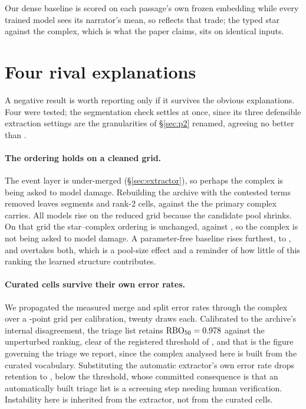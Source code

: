 \documentclass[conference]{IEEEtran}
\begin{document}
Our dense baseline is scored on each passage's own frozen embedding while every trained model
sees its narrator's mean, so \MoneTone{} reflects that trade; the typed star against the
complex, which is what the paper claims, sits on identical inputs.

\section{Four rival explanations}

A negative result is worth reporting only if it survives the obvious explanations. Four were
tested; the segmentation check settles at once, since its three defensible extraction settings
are the granularities of \S\ref{sec:p2} renamed, agreeing no better than \extractorMinRbo{}.

\paragraph{The ordering holds on a cleaned grid.} The event layer is
under-merged (\S\ref{sec:extractor}), so perhaps the complex is being asked to model damage.
Rebuilding the archive with the \goldTermsExcluded{} contested terms removed leaves
\goldSubsetSegments{} segments and \goldCells{} rank-2 cells, against the \nRankTwoCells{}
the primary complex carries. All models rise on the reduced grid because the candidate pool
shrinks. On that grid the star--complex ordering is unchanged, \goldMthree{} against
\goldMfive{}, so the
complex is not being asked to model damage. A parameter-free baseline rises furthest, to
\goldMone{}, and overtakes both, which is a pool-size effect and a reminder of how little of
this ranking the learned structure contributes.

\paragraph{Curated cells survive their own error rates.} We propagated the measured merge and
split error rates through the complex over a \pertGridPoints{}-point grid per calibration,
twenty draws each. Calibrated to the archive's internal disagreement, the triage list retains
$\text{RBO}_{50} = 0.978{}$ against the unperturbed ranking, clear of the registered
threshold of \pertThreshold{}, and that is the figure governing the triage we report, since
the complex analysed here is built from the curated vocabulary. Substituting the automatic
extractor's own error rate drops retention to \pertRbo{}, below the threshold, whose committed
consequence is that an automatically built triage list is a screening step needing human
verification. Instability here is inherited from the extractor, not from the curated cells.
\end{document}

